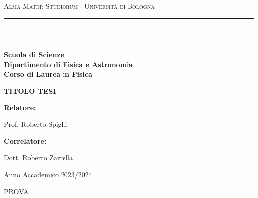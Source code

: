 \documentclass[12pt,a4paper,twoside]{report}
\newenvironment{dedication}{
	\clearpage           %
	\thispagestyle{empty}%
	\vspace*{\stretch{1}}%
	\itshape             %
	\raggedleft          %
}
{\par %
	\vspace{\stretch{3}} %
	\clearpage           %
}
\begin{document}
	\begin{titlepage}
		\begin{center}
			{{\Large{\textsc{Alma Mater Studiorum $\cdot$ Universit\`a di Bologna}}}} 
			\rule[0.1cm]{15.8cm}{0.1mm}
			\rule[0.5cm]{15.8cm}{0.6mm}
			\\\vspace{3mm}
			
			{\small{\bf Scuola di Scienze \\ 
					Dipartimento di Fisica e Astronomia\\
					Corso di Laurea in Fisica}}
			
		\end{center}
		
		\vspace{23mm}
		
		\begin{center}
			{\LARGE{\bf TITOLO TESI}}\\
		\end{center}
		
		\vspace{50mm} \par \noindent
		
		\begin{minipage}[t]{0.47\textwidth}
			{\large{\bf Relatore: \vspace{2mm}
					
					Prof. Roberto Spighi}}
		\end{minipage}
		\hfill
		\begin{minipage}[t]{0.47\textwidth}
		\end{minipage}
		
		\par
		\vspace{\baselineskip}
		
		\begin{minipage}[t]{0.47\textwidth}
			{\large{\bf Correlatore: \vspace{2mm}
					
					Dott. Roberto Zarrella}}
		\end{minipage}
		
		\vspace{45mm}
		
		\begin{center}
			Anno Accademico { 2023/2024}
		\end{center}
		
	\end{titlepage}
	\newpage
	\onehalfspacing %
	\begin{dedication}
		PROVA
	\end{dedication}
\end{document}
